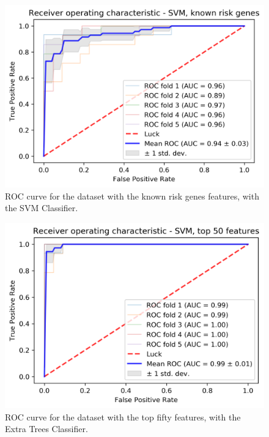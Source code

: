 \begin{figure}[H]
	\centering
	\includegraphics[width=5in]{../images/results/svm_risk.png}
	\caption{ROC curve for the dataset with the known risk genes features, with the SVM Classifier.} 
	\label{fig:svm_risk}
\end{figure}

\begin{figure}[H]
	\centering
	\includegraphics[width=5in]{../images/results/svm_top.png}
	\caption{ROC curve for the dataset with the top fifty features, with the Extra Trees Classifier.} 
	\label{fig:svm_top}
\end{figure}


